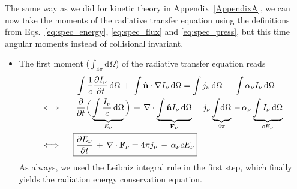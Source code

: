 The same way as we did for kinetic theory in Appendix~\ref{AppendixA}, we can now take the moments of the radiative transfer equation using the definitions from Eqs.~\eqref{eq:spec_energy}, \eqref{eq:spec_flux} and \eqref{eq:spec_press}, but this time angular moments instead of collisional invariant.
\begin{itemize}
 \item The first moment ($\int_{4\pi} \mathrm{d}\Omega$) of the radiative transfer equation reads
  \begin{align*}
   &\int \frac{1}{c}\frac{\partial I_{\nu}}{\partial t} \,\mathrm{d}\Omega \,+\, \int \hat{\textbf{n}}\cdot\nabla I_{\nu} \,\mathrm{d}\Omega = \int j_{\nu} \,\mathrm{d}\Omega \,-\, \int \alpha_{\nu}I_{\nu} \,\mathrm{d}\Omega \\
   \Longleftrightarrow\qquad
   &\frac{\partial}{\partial t}\Big(\underbrace{ \int \frac{I_{\nu}}{c} \,\mathrm{d}\Omega }_{E_{\nu}}\Big) \,+\, \nabla\cdot\underbrace{ \int \hat{\textbf{n}}I_{\nu} \,\mathrm{d}\Omega }_{\textbf{F}_{\nu}} = j_{\nu}\underbrace{ \int\!\mathrm{d}\Omega }_{4\pi} \,-\, \alpha_{\nu}\underbrace{ \int I_{\nu} \,\mathrm{d}\Omega }_{cE_{\nu}} \\
   \Longleftrightarrow\qquad\!\!
   \Aboxed{&\frac{\partial E_{\nu}}{\partial t} \,+\, \nabla\cdot\textbf{F}_{\nu} = 4\pi j_{\nu}\,-\, \alpha_{\nu}cE_{\nu}}
  \end{align*}
  As always, we used the Leibniz integral rule in the first step, which finally yields the radiation energy conservation equation.


\end{itemize}
